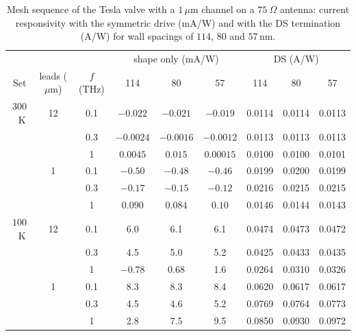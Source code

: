 \documentclass[aps,prapplied,onecolumn,superscriptaddress,floatfix]{revtex4-2}
\newcommand{\um}{\,\mu\mathrm{m}}
\newcommand{\nm}{\,\mathrm{nm}}
\begin{document}
\begin{table}[ht]
\caption{\label{tab:valvemesh}Mesh sequence of the Tesla valve with a
$1\um$ channel on a $75\ \Omega$ antenna: current responsivity with the
symmetric drive (mA/W) and with the DS termination (A/W) for wall
spacings of $114$, $80$ and $57\nm$.}
\begin{ruledtabular}
\begin{tabular}{ccccccccc}
 & & & \multicolumn{3}{c}{shape only (mA/W)} & \multicolumn{3}{c}{DS (A/W)} \\
Set & leads ($\mu$m) & $f$ (THz) & 114 & 80 & 57 & 114 & 80 & 57 \\
\hline
$300$~K & 12 & 0.1 & $-0.022$ & $-0.021$ & $-0.019$ & 0.0114 & 0.0114 & 0.0113 \\
 & & 0.3 & $-0.0024$ & $-0.0016$ & $-0.0012$ & 0.0113 & 0.0113 & 0.0113 \\
 & & 1 & $0.0045$ & $0.015$ & $0.00015$ & 0.0100 & 0.0100 & 0.0101 \\
 & 1 & 0.1 & $-0.50$ & $-0.48$ & $-0.46$ & 0.0199 & 0.0200 & 0.0199 \\
 & & 0.3 & $-0.17$ & $-0.15$ & $-0.12$ & 0.0216 & 0.0215 & 0.0215 \\
 & & 1 & $0.090$ & $0.084$ & $0.10$ & 0.0146 & 0.0144 & 0.0143 \\
$100$~K & 12 & 0.1 & 6.0 & 6.1 & 6.1 & 0.0474 & 0.0473 & 0.0472 \\
 & & 0.3 & 4.5 & 5.0 & 5.2 & 0.0425 & 0.0433 & 0.0435 \\
 & & 1 & $-0.78$ & 0.68 & 1.6 & 0.0264 & 0.0310 & 0.0326 \\
 & 1 & 0.1 & 8.3 & 8.3 & 8.4 & 0.0620 & 0.0617 & 0.0617 \\
 & & 0.3 & 4.5 & 4.6 & 5.2 & 0.0769 & 0.0764 & 0.0773 \\
 & & 1 & 2.8 & 7.5 & 9.5 & 0.0850 & 0.0930 & 0.0972 \\
\end{tabular}
\end{ruledtabular}
\end{table}
\end{document}
